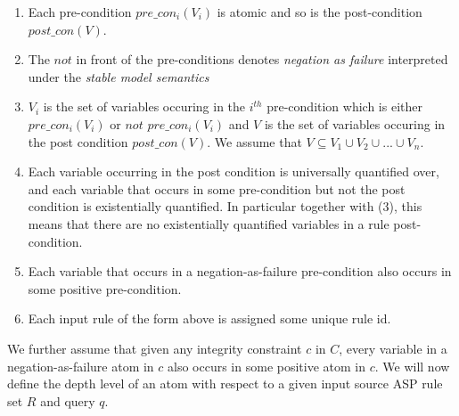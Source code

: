 \begin{enumerate}
    \item Each pre-condition $pre\_con_{i}(V_{i})$ is atomic and so is the post-condition $post\_con(V)$.
    \item The $not$ in front of the pre-conditions denotes \textit{negation as failure} interpreted under the \textit{stable model semantics}
    \item $V_{i}$ is the set of variables occuring in the $i^{th}$ pre-condition which is either $pre\_con_{i}(V_{i})$ or $not$ $pre\_con_{i}(V_{i})$ and $V$ is the set of variables occuring in the post condition $post\_con(V)$. We assume that $V\subseteq V_{1}\cup V_{2}\cup ... \cup V_{n}$.
    \item Each variable occurring in the post condition is universally quantified over, and each variable that occurs in some pre-condition but not the post condition is existentially quantified. In particular together with (3), this means that there are no existentially quantified variables in a rule post-condition.
    \item Each variable that occurs in a negation-as-failure pre-condition also occurs in some positive pre-condition.
    \item Each input rule of the form above is assigned some unique rule id.
\end{enumerate}

We further assume that given any integrity constraint $c$ in $C$, every variable in a negation-as-failure atom in $c$ also occurs in some positive atom in $c$. We will now define the depth level of an atom with respect to a given input source ASP rule set $R$ and query $q$.

